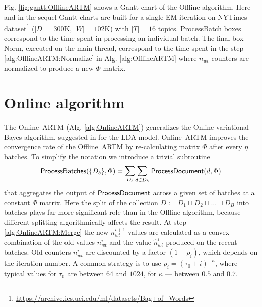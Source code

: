 \documentclass[russian,english]{llncs}
\newcommand{\kw}[1]{\mbox{\textsf{#1}}}
\begin{document}
Fig. \ref{fig:gantt:OfflineARTM} shows a Gantt chart of the \kw{Offline} algorithm.
Here and in the sequel Gantt charts are built for a single EM-iteration on
\kw{NYTimes} dataset\footnote{\url{https://archive.ics.uci.edu/ml/datasets/Bag+of+Words}}
($|D|=300$K, $|W|=102$K) with $|T|=16$ topics.
\kw{ProcessBatch} boxes correspond to the time spent in processing an individual batch.
The final box \kw{Norm}, executed on the main thread,
correspond to the time spent in the step \ref{alg:OfflineARTM:Normalize} in Alg. \ref{alg:OfflineARTM}
where $n_{wt}$ counters are normalized to produce a new $\Phi$ matrix.


\section{Online algorithm}
\label{sec:OnlineARTM}

The \kw{Online ARTM} (Alg. \ref{alg:OnlineARTM}) generalizes
the Online variational Bayes algorithm,
suggested in \cite{hoffman10online} for the LDA model.
\kw{Online ARTM} improves the convergence rate of the \kw{Offline ARTM}
by re-calculating matrix $\Phi$ after every $\eta$ batches.
To simplify the notation
we introduce a trivial subroutine
\[
\kw{ProcessBatches}(\{D_b\}, \Phi) = \mathlarger\sum\limits_{D_b} \mathlarger\sum\limits_{d \in D_b} \; \kw{ProcessDocument}(d, \Phi) \\
\]
that aggregates the output of $\kw{ProcessDocument}$ across a given set of batches at a constant $\Phi$ matrix.
Here the split of the collection $D := D_1 \sqcup D_2 \sqcup \dots \sqcup D_B$
into batches
plays far more significant role than in the \kw{Offline} algorithm,
because different splitting algorithmically affects the result.
At step \ref{alg:OnlineARTM:Merge} the new $n_{wt}^{i+1}$ values are calculated as a convex combination
of the old values $n_{wt}^{i}$ and the value $\hat n_{wt}^{i}$ produced on the recent batches.
Old counters $n_{wt}^{i}$ are discounted by a factor $(1 - \rho_i)$,
which depends on the iteration number. A common strategy is to use $\rho_i = (\tau_0 + i)^{-\kappa}$,
where typical values for $\tau_0$ are between $64$ and $1024$, for $\kappa$ --- between $0.5$ and $0.7$.
\end{document}
